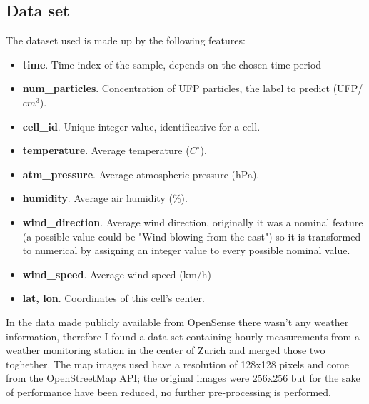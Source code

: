 \documentclass[11pt,a4paper,titlepage]{book}
\begin{document}
\subsection{Data set}
The dataset used is made up by the following features:
\begin{itemize}
    \item \textbf{time}. Time index of the sample, depends on the chosen time period
    \item \textbf{num\_particles}. Concentration of UFP particles, the label to predict (UFP/$cm^3$).
    \item \textbf{cell\_id}. Unique integer value, identificative for a cell.
    \item \textbf{temperature}. Average temperature ($C^{\circ}$).
    \item \textbf{atm\_pressure}. Average atmospheric pressure (hPa).
    \item \textbf{humidity}. Average air humidity (\%).
    \item \textbf{wind\_direction}. Average wind direction, originally it was a nominal feature (a possible value could be "Wind blowing from the east") so it is transformed to numerical by assigning an integer value to every possible nominal value.
    \item \textbf{wind\_speed}. Average wind speed (km/h)
    \item \textbf{lat, lon}. Coordinates of this cell's center.
\end{itemize}
In the data made publicly available from OpenSense there wasn't any weather information, therefore I found a data set containing hourly measurements from a weather monitoring station in the center of Zurich and merged those two toghether.
\newline
\newline
The map images used have a resolution of 128x128 pixels and come from the OpenStreetMap API; the original images were 256x256 but for the sake of performance have been reduced, no further pre-processing is performed.
\end{document}
